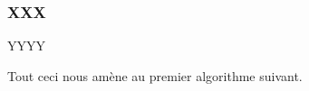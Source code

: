 \subsubsection{XXX} \label{algos-used-kill}

\leavevmode
\smallskip

YYYY







\newpage

Tout ceci nous amène au premier algorithme suivant.

{\small
\begin{algo}[frame] \label{algo-kill}
	\BlankLine
\end{algo}
}